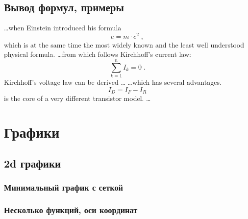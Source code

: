 \documentclass[oneside,final,14pt]{extreport}
\begin{document}
\subsection{Вывод формул, примеры}
\ldots when Einstein introduced his formula
\begin{equation}
	e = m \cdot c^2 \; ,
\end{equation}
which is at the same time the most widely known
and the least well understood physical formula.
\ldots from which follows Kirchhoff's current law:
\begin{equation}
	\sum_{k=1}^{n} I_k = 0 \; .
\end{equation}
Kirchhoff's voltage law can be derived \ldots
\ldots which has several advantages.
\begin{equation}
	I_D = I_F - I_R
\end{equation}
is the core of a very different transistor model. \ldots
\section{Графики}

\subsection{2d графики}

\subsubsection{Минимальный график с сеткой}


\subsubsection{Несколько функций, оси координат}

\end{document}

